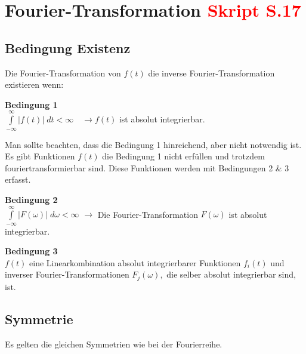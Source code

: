 
\section{Fourier-Transformation \small{\textcolor{red}{Skript S.17}}}%
	\subsection{Bedingung Existenz}%
		\vspace{-3mm}	%
		Die Fourier-Transformation von $f(t)$
		die inverse Fourier-Transformation existieren  wenn:
		
		\textbf{Bedingung 1}\\
			$\int\limits_{-\infty}^{\infty}|f(t)| \; d t<\infty \quad \rightarrow f(t)$ ist absolut integrierbar.
			
		Man sollte beachten, dass die Bedingung 1 hinreichend, aber nicht notwendig ist. Es gibt Funktionen $f(t)$ die Bedingung 1 nicht erfüllen und trotzdem fouriertransformierbar sind. Diese Funktionen werden mit Bedingungen 2 \& 3 erfasst. 
		
		\textbf{Bedingung 2}\\
			$\int\limits_{-\infty}^{\infty}|F(\omega)| \; d \omega<\infty$ \quad
			$\rightarrow$ Die Fourier-Transformation $F( \omega)$ ist absolut integrierbar.
			
		\textbf{Bedingung 3}\\
			$f(t)$ eine Linearkombination absolut integrierbarer Funktionen
			$f_{i}(t)$ und inverser Fourier-Transformationen $F_{j}(\omega),$ die selber
			absolut integrierbar sind, ist.
			
	\subsection{Symmetrie}%
		\vspace{-3mm}	%
		Es gelten die gleichen Symmetrien wie bei der Fourierreihe.

